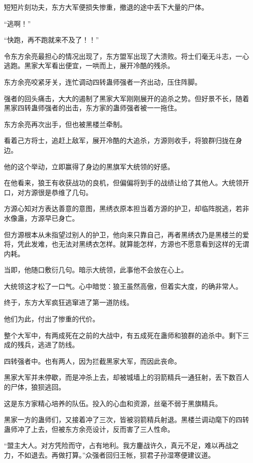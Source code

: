 
\begin{this_body}

短短片刻功夫，东方大军便损失惨重，撤退的途中丢下大量的尸体。

“逃啊！”

“快跑，再不跑就来不及了！！”

令东方余亮最担心的情况出现了，东方盟军出现了大溃败。将士们毫无斗志，一心逃跑。黑家大军看出便宜，一哄而上，展开冷酷的残杀。

东方余亮咬紧牙关，连忙调动四转蛊师强者一齐出动，压住阵脚。

强者的回头痛击，大大的遏制了黑家大军刚刚展开的追杀之势。但好景不长，随着黑家四转蛊师强者的出击，东方家的蛊师强者被一一拖住。

东方余亮再次出手，但也被黑楼兰牵制。

看着己方将士，追赶上敌军，展开冷酷的大追杀，方源则收手，将狼群归拢在身边。

他的这个举动，立即赢得了身边的黑旗军大统领的好感。

在他看来，狼王有收获战功的良机，但偏偏将到手的战绩让给了其他人。大统领开口，对方源很是恭维了几句。

方源心知对方表达善意的意图，黑绣衣原本担当着方源的护卫，却临阵脱逃，若非水像蛊，方源早已身亡。

但方源根本从未指望过别人的护卫，他向来只靠自己，再者黑绣衣乃是黑楼兰的爱将，凭此发难，也无法对黑绣衣怎样。就算能怎样，方源也不愿意看到这样的无谓内耗。

当即，他随口敷衍几句。暗示大统领，此事他不会放在心上。

大统领这才松了一口气。心中暗觉：狼王虽然高傲，但着实大度，的确非常人。

终于，东方大军疯狂逃窜进了第一道防线。

他们为此，付出了惨重的代价。

整个大军中，有两成死在之前的大战中，有五成死在蛊师和狼群的追杀中。剩下三成的残兵，逃进了防线。

四转强者中。也有两人，因为拦截黑家大军，而因此丧命。

黑家大军并未停歇，而是冲杀上去，却被城墙上的羽箭精兵一通狂射，丢下数百人的尸体，狼狈逃回。

这是东方家精心培养的队伍。投入的心血和资源，丝毫不弱于黑旗精兵。

黑家一方的蛊师们，又接着冲了三次，皆被羽箭精兵射退。黑楼兰调动麾下的四转蛊师冲了上去，但被东方余亮设计，反而害了三人性命。

“盟主大人。对方凭险而守，占有地利。我方鏖战许久，真元不足，难以再战之力，不如退去。再做打算。”众强者回归王帐，狈君子孙湿寒便建议道。


\end{this_body}
